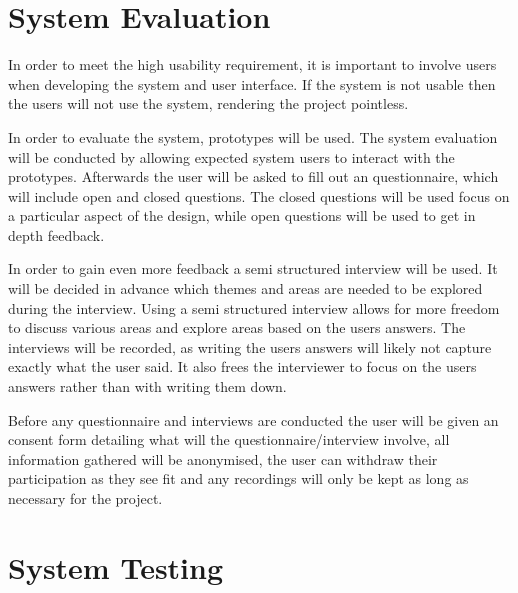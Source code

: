 \documentclass[a4paper,oneside,11pt]{report}
\begin{document}
\section{System Evaluation}
In order to meet the high usability requirement, it is important to involve users when developing the system and user interface. If the system is not usable then the users will not use the system, rendering the project pointless.

In order to evaluate the system, prototypes will be used. The system evaluation will be conducted by allowing expected system users to interact with the prototypes. Afterwards the user will be asked to fill out an questionnaire, which will include open and closed questions. The closed questions will be used focus on a particular aspect of the design, while open questions will be used to get in depth feedback. 

In order to gain even more feedback a semi structured interview will be used. It will be decided in advance which themes and areas are needed to be explored during the interview. Using a semi structured interview allows for more freedom to discuss various areas and explore areas based on the users answers. The interviews will be recorded, as writing the users answers will likely not capture exactly what the user said. It also frees the interviewer to focus on the users answers rather than with writing them down.

Before any questionnaire and interviews are conducted the user will be given an consent form detailing what will the questionnaire/interview involve, all information gathered will be anonymised, the user can withdraw their participation as they see fit and any recordings will only be kept as long as necessary for the project.
\section{System Testing}
\end{document}
